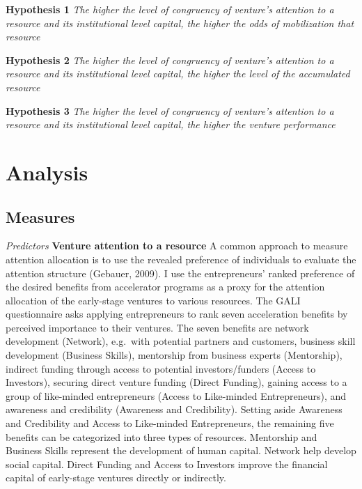 \documentclass[
  english,
  man]{apa6}
\begin{document}
\textbf{Hypothesis 1} \emph{The higher the level of congruency of venture's attention to a resource and its institutional level capital, the higher the odds of mobilization that resource}

\textbf{Hypothesis 2} \emph{The higher the level of congruency of venture's attention to a resource and its institutional level capital, the higher the level of the accumulated resource}

\textbf{Hypothesis 3} \emph{The higher the level of congruency of venture's attention to a resource and its institutional level capital, the higher the venture performance}

\hypertarget{analysis}{%
\section{Analysis}\label{analysis}}

\hypertarget{measures}{%
\subsection{Measures}\label{measures}}

\emph{Predictors}
\textbf{Venture attention to a resource} A common approach to measure attention allocation is to use the revealed preference of individuals to evaluate the attention structure (Gebauer, 2009). I use the entrepreneurs' ranked preference of the desired benefits from accelerator programs as a proxy for the attention allocation of the early-stage ventures to various resources. The GALI questionnaire asks applying entrepreneurs to rank seven acceleration benefits by perceived importance to their ventures. The seven benefits are network development (Network), e.g.~with potential partners and customers, business skill development (Business Skills), mentorship from business experts (Mentorship), indirect funding through access to potential investors/funders (Access to Investors), securing direct venture funding (Direct Funding), gaining access to a group of like-minded entrepreneurs (Access to Like-minded Entrepreneurs), and awareness and credibility (Awareness and Credibility). Setting aside Awareness and Credibility and Access to Like-minded Entrepreneurs, the remaining five benefits can be categorized into three types of resources. Mentorship and Business Skills represent the development of human capital. Network help develop social capital. Direct Funding and Access to Investors improve the financial capital of early-stage ventures directly or indirectly.
\end{document}
